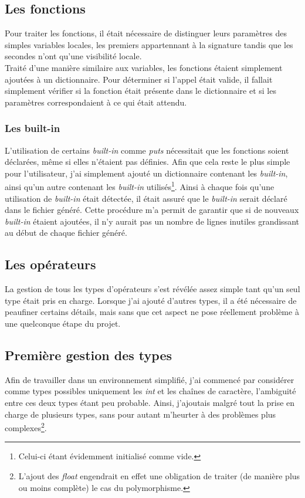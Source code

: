 \documentclass[12pt]{article}
\begin{document}
\subsection{Les fonctions}
Pour traiter les fonctions, il était nécessaire de distinguer leurs
paramètres des simples variables locales, les premiers appartennant à la
signature tandis que les secondes n'ont qu'une visibilité locale.\\

Traité d'une manière similaire aux variables, les fonctions étaient
simplement ajoutées à un dictionnaire. Pour déterminer si l'appel était
valide, il fallait simplement vérifier si la fonction était présente dans le
dictionnaire et si les paramètres correspondaient à ce qui était attendu.

\subsubsection{Les built-in}
L'utilisation de certains {\em built-in} comme {\em puts} nécessitait que les
fonctions soient déclarées, même si elles n'étaient pas définies. Afin que
cela reste le plus simple pour l'utilisateur, j'ai simplement ajouté un
dictionnaire contenant les {\em built-in}, ainsi qu'un autre contenant les
{\em built-in} utilisés\footnote{Celui-ci étant évidemment initialisé comme
vide.}. Ainsi à chaque fois qu'une utilisation de {\em built-in} était
détectée, il était assuré que le {\em built-in} serait déclaré dans le fichier
généré. Cette procédure m'a permit de garantir que si de nouveaux
{\em built-in} étaient ajoutées, il n'y aurait pas un nombre de lignes inutiles
grandissant au début de chaque fichier généré.

\subsection{Les opérateurs}
La gestion de tous les types d'opérateurs s'est révélée assez simple tant qu'un
seul type était pris en charge. Lorsque j'ai ajouté d'autres types, il a été
nécessaire de peaufiner certains détails, mais sans que cet aspect ne pose
réellement problème à une quelconque étape du projet.

\subsection{Première gestion des types}
Afin de travailler dans un environnement simplifié, j'ai commencé par
considérer comme types possibles uniquement les {\em int} et les chaînes de
caractère, l'ambiguité entre ces deux types étant peu probable. Ainsi,
j'ajoutais malgré tout la prise en charge de plusieurs types, sans pour autant
m'heurter à des problèmes plus complexes\footnote{L'ajout des {\em float}
engendrait en effet une obligation de traiter (de manière plus ou moins complète)
le cas du polymorphisme.}.
\end{document}
